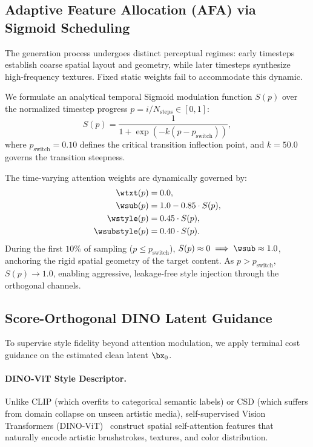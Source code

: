 \subsection{Adaptive Feature Allocation (AFA) via Sigmoid Scheduling}
\label{subsec:afa}
The generation process undergoes distinct perceptual regimes: early timesteps establish coarse spatial layout and geometry, while later timesteps synthesize high-frequency textures. Fixed static weights fail to accommodate this dynamic.

We formulate an analytical temporal Sigmoid modulation function $S(p)$ over the normalized timestep progress $p = i / N_{\text{steps}} \in [0, 1]$:
\begin{equation}
    S(p) = \frac{1}{1 + \exp\left( -k (p - p_{\text{switch}}) \right)},
    \label{eq:sigmoid_schedule}
\end{equation}
where $p_{\text{switch}} = 0.10$ defines the critical transition inflection point, and $k = 50.0$ governs the transition steepness.

The time-varying attention weights are dynamically governed by:
\begin{align}
    \wtxt(p) &= 0.0, \\
    \wsub(p) &= 1.0 - 0.85 \cdot S(p), \\
    \wstyle(p) &= 0.45 \cdot S(p), \\
    \wsubstyle(p) &= 0.40 \cdot S(p).
\end{align}
During the first $10\%$ of sampling ($p \le p_{\text{switch}}$), $S(p) \approx 0 \implies \wsub \approx 1.0$, anchoring the rigid spatial geometry of the target content. As $p > p_{\text{switch}}$, $S(p) \to 1.0$, enabling aggressive, leakage-free style injection through the orthogonal channels.

\subsection{Score-Orthogonal DINO Latent Guidance}
\label{subsec:score_ortho}
To supervise style fidelity beyond attention modulation, we apply terminal cost guidance on the estimated clean latent $\bx_0$.

\paragraph{DINO-ViT Style Descriptor.}
Unlike CLIP (which overfits to categorical semantic labels) or CSD (which suffers from domain collapse on unseen artistic media), self-supervised Vision Transformers (DINO-ViT)~\cite{caron2021emerging} construct spatial self-attention features that naturally encode artistic brushstrokes, textures, and color distribution.

